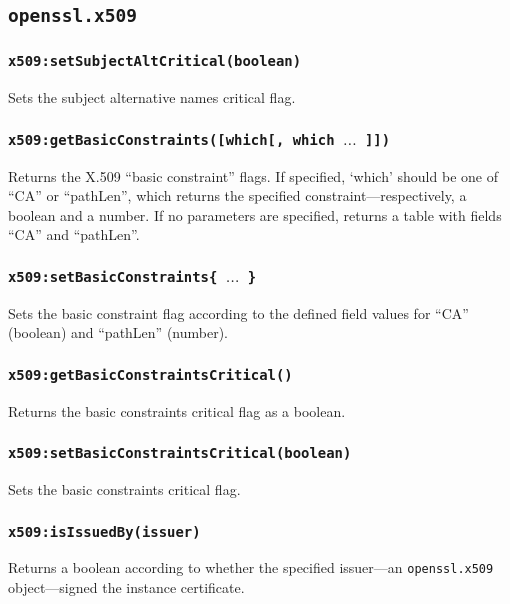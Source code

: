\documentclass[11pt, oneside]{memoir}
\newcommand*{\fn}[1]{\texttt{#1}\xspace}
\newcommand*{\module}[1]{\texttt{#1}\xspace}
\newcounter{toccols}
\newenvironment{Module}[1]{
	\subsection{\texttt{#1}}
	\addtocontents{toc}{
		\protect\begin{multicols}{\value{toccols}}
	}
}{
	\addtocontents{toc}{\protect\end{multicols}}
}
\begin{document}
\begin{Module}{openssl.x509}
\subsubsection[\fn{x509:setSubjectAltCritical}]{\fn{x509:setSubjectAltCritical(boolean)}}

Sets the subject alternative names critical flag.

\subsubsection[\fn{x509:getBasicConstraints}]{\fn{x509:getBasicConstraints([which[, which $\ldots$ ]])}}

Returns the X.509 ``basic constraint'' flags. If specified, `which' should be one of ``CA'' or ``pathLen'', which returns the specified constraint---respectively, a boolean and a number.  If no parameters are specified, returns a table with fields ``CA'' and ``pathLen''.

\subsubsection[\fn{x509:setBasicConstraints}]{\fn{x509:setBasicConstraints\{ $\ldots$ \}}}

Sets the basic constraint flag according to the defined field values for ``CA'' (boolean) and ``pathLen'' (number).

\subsubsection[\fn{x509:getBasicConstraintsCritical}]{\fn{x509:getBasicConstraintsCritical()}}

Returns the basic constraints critical flag as a boolean.

\subsubsection[\fn{x509:setBasicConstraintsCritical}]{\fn{x509:setBasicConstraintsCritical(boolean)}}

Sets the basic constraints critical flag.

\subsubsection[\fn{x509:isIssuedBy}]{\fn{x509:isIssuedBy(issuer)}}

Returns a boolean according to whether the specified issuer---an \module{openssl.x509} object---signed the instance certificate.


\end{Module}
\end{document}
